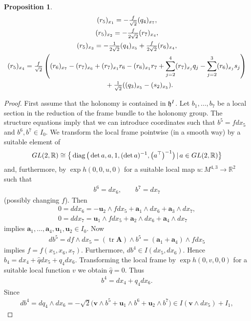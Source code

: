 \documentclass[11pt]{article}
\numberwithin{equation}{section}
\newtheorem{Proposition}[Theorem]{Proposition}
 { \theoremstyle{definition}
\newtheorem{Definition}[Theorem]{Definition}
\newtheorem{Example}[Theorem]{Example}
\newtheorem{Remark}[Theorem]{Remark} }
\newcommand\fh{{\frak h}}
\newcommand\ba{{\mathbf a}}
\newcommand\bA{{\mathbf A}}
\newcommand\bu{{\mathbf u}}
\newcommand\bv{{\mathbf v}}
\newcommand\RR{{\mathbb R}}
\newcommand{\GL}{\mathop{{\rm GL}}}
\newcommand{\tr}{\operatorname{tr}}
\newcommand{\diag}{\operatorname{diag}}
\begin{document}
\begin{Proposition}
\begin{gather}
(r_5)_{x_1}=- \tfrac f{\sqrt 2} (q_4)_{x_7}, \label{Eb6}\\
(r_5)_{x_2}=- \tfrac f{2\sqrt 2} (r_7)_{x_4}, \label{Eb7}\\
(r_5)_{x_3}=- \tfrac1{2\sqrt 2} (q_4)_{x_5}+ \tfrac f{2\sqrt 2} (r_6)_{x_4}, \label{Eb7a}\\
(r_5)_{x_4}= \tfrac f{\sqrt 2} \left( (r_6)_{x_7}-(r_7)_{x_6}+(r_7)_{x_1}r_6-(r_6)_{x_1}r_7+\sum_{j=2}^4 (r_7)_{x_j}q_j-\sum_{j=2}^3 (r_6)_{x_j}s_j\right) \nonumber\\
\hphantom{(r_5)_{x_4}=}{} + \tfrac 1{\sqrt 2} ((q_3)_{x_5}-(s_2)_{x_5}).\label{Eb10}
\end{gather}
\end{Proposition}
\begin{proof}First assume that the holonomy is contained in $\fh^I$. Let $b_1,\dots,b_7$ be a local section in the reduction of the frame bundle to the holonomy group. The structure equations imply that we can introduce coordinates such that $b^5=fdx_5$ and $b^6,b^7\in I_0$. We transform the local frame pointwise (in a smooth way) by a suitable element of \begin{gather*}\GL(2,\RR)\cong \big\{\diag\big(\det a, a,1, (\det a)^{-1}, \big(a^\top\big)^{-1}\big)\,|\, a\in\GL(2,\RR)\big\}\end{gather*} and, furthermore, by $\exp h(0,0,u,0)$ for a suitable local map $u\colon M^{4,3} \rightarrow \RR^2$ such that
\begin{gather*}b^6=dx_6,\qquad b^7=dx_7\end{gather*}
(possibly changing $f$). Then
\begin{gather*}
0 =ddx_6= -\bu_2\wedge fdx_5+\ba_1\wedge dx_6 +\ba_3\wedge dx_7,\\
0 =ddx_7= \bu_1\wedge fdx_5+\ba_2\wedge dx_6 +\ba_4\wedge dx_7
\end{gather*}
implies $\ba_1,\dots,\ba_4,\bu_1, \bu_2\in I_0$. Now
\begin{gather*}db^5=df\wedge dx_5=(\tr \bA)\wedge b^5= (\ba_1+\ba_4)\wedge fdx_5\end{gather*}
implies $f=f(x_5,x_6,x_7)$.
Furthermore, $db^4\in I(dx_5,dx_6)$. Hence $b_4=dx_4+\hat qdx_5+q_4 dx_6$. Transforming the local frame by $\exp h(0,v,0,0)$ for a suitable local function $v$ we obtain $\hat q=0$. Thus
\begin{gather*}b^4=dx_4+q_4 dx_6.\end{gather*}
Since
\begin{gather*} db^4=dq_4\wedge dx_6 =-\sqrt 2\big( \bv\wedge b^5+ \bu_1\wedge b^6 +\bu_2\wedge b^7\big)\in I(\bv\wedge dx_5)+ I_1,\end{gather*}

\end{proof}
\end{document}

